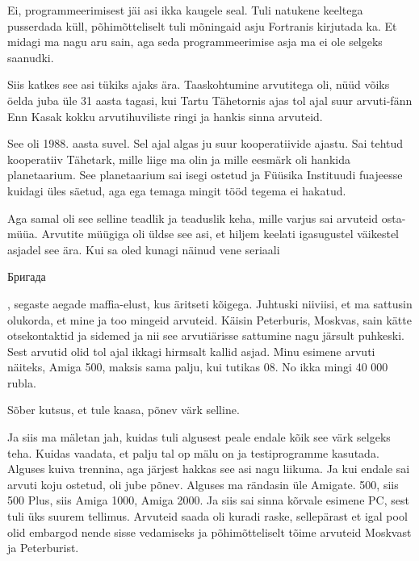 Ei, programmeerimisest jäi asi ikka kaugele seal. Tuli natukene keeltega 
pusserdada küll,  põhimõtteliselt tuli mõningaid asju Fortranis 
kirjutada ka. Et midagi ma nagu aru sain, aga seda programmeerimise asja ma ei 
ole selgeks saanudki. 

Siis katkes see asi tükiks ajaks ära. Taaskohtumine arvutitega oli, nüüd võiks 
öelda juba üle 31 aasta tagasi, kui Tartu Tähetornis ajas 
tol ajal suur arvuti-fänn Enn Kasak kokku arvutihuviliste ringi ja hankis sinna 
arvuteid.


See oli 1988. aasta suvel. Sel ajal algas ju suur kooperatiivide ajastu. Sai 
tehtud kooperatiiv Tähetark, mille liige ma olin ja mille 
eesmärk oli hankida planetaarium. See planetaarium sai isegi ostetud ja  
Füüsika Instituudi fuajeesse kuidagi üles 
säetud, aga ega temaga mingit tööd tegema ei hakatud. 

Aga samal oli see selline teadlik ja teaduslik keha,  mille varjus sai arvuteid 
osta-müüa. Arvutite müügiga oli üldse see asi, et hiljem keelati igasugustel 
väikestel asjadel see ära. Kui sa oled kunagi näinud vene seriaali 
\begin{russian}Бригада\end{russian}, segaste aegade maffia-elust, kus äritseti 
kõigega. Juhtuski niiviisi, et ma sattusin  olukorda, et mine ja too mingeid 
arvuteid. Käisin Peterburis, Moskvas, sain kätte otsekontaktid ja sidemed ja 
nii see arvutiärisse sattumine nagu järsult puhkeski. Sest arvutid olid tol 
ajal ikkagi hirmsalt kallid asjad. Minu esimene arvuti näiteks, Amiga 
500,  maksis sama palju, kui tutikas 08. No ikka mingi 40 000 rubla.
                 

Sõber kutsus, et tule kaasa, põnev värk selline.

Ja siis ma mäletan jah, kuidas tuli algusest peale endale kõik see värk selgeks 
teha. Kuidas vaadata, et palju tal op mälu on ja testiprogramme kasutada. 
Alguses kuiva trennina, aga järjest hakkas see asi nagu liikuma. Ja kui endale 
sai arvuti koju ostetud,  oli jube põnev. Alguses ma rändasin  üle Amigate.  
500, siis 500 Plus, siis 
Amiga 1000, Amiga 2000. Ja siis 
sai sinna kõrvale esimene PC, sest tuli üks suurem tellimus. Arvuteid saada oli 
kuradi raske, sellepärast et igal pool olid embargod nende sisse vedamiseks ja  
põhimõtteliselt tõime arvuteid Moskvast ja 
Peterburist.\label{sisu!veiko_moskvas}

